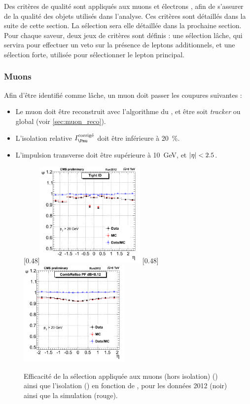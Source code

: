 Des critères de qualité sont appliqués aux muons et électrons \pf, afin de s'assurer de la qualité des objets utilisés dans l'analyse. Ces critères sont détaillés dans la suite de cette section. La sélection sera elle détaillée dans la prochaine section. Pour chaque saveur, deux jeux de critères sont définis : une sélection lâche, qui servira pour effectuer un veto sur la présence de leptons additionnels, et une sélection forte, utilisée pour sélectionner le lepton principal.

\subsubsection{Muons} \label{sec:sel_muon}

Afin d'être identifié comme lâche, un muon doit passer les coupures suivantes :
\begin{itemize}
    \item Le muon doit être reconstruit avec l'algorithme du \pf, et être soit \emph{tracker} ou global (voir \cref{sec:muon_reco}).
    \item L'isolation relative $I_{\Pmu}^\text{corrigé}$ doit être inférieure à \SI{20}{\%}.
    \item L'impulsion transverse doit être supérieure à \SI{10}{\GeV}, et $\lvert \eta \rvert < \num{2.5}$.
\end{itemize}

\begin{figure}[tbp] \centering
    \subcaptionbox{\label{fig:muon_id_eff}}[0.48\textwidth]{\includegraphics[width=0.48\textwidth]{chapitre7/figs/muon_id_efficiency.png}} \hfill
    \subcaptionbox{\label{fig:muon_iso_eff}}[0.48\textwidth]{\includegraphics[width=0.48\textwidth]{chapitre7/figs/muon_iso_efficiency.png}}
    \caption{Efficacité de la sélection appliquée aux muons (hors isolation) () ainsi que l'isolation () en fonction de \aeta, pour les données 2012 (noir) ainsi que la simulation (rouge).}
\end{figure}

